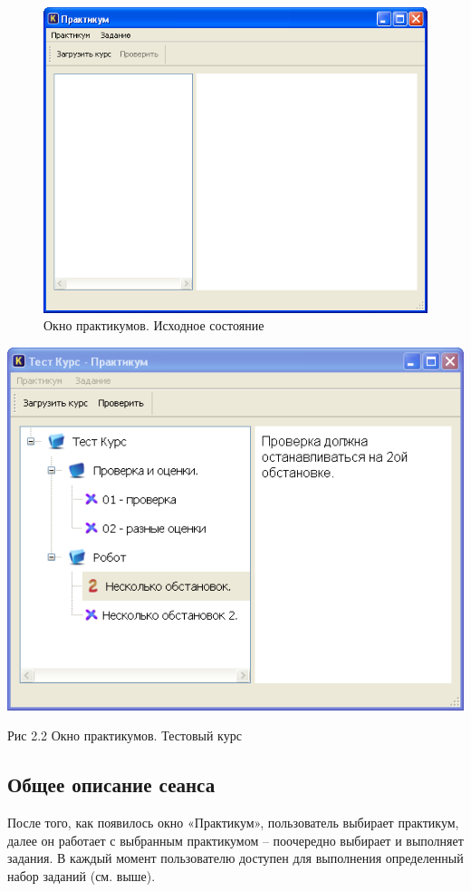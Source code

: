 \begin{figure}[!htb]
\begin{center}
\includegraphics[scale=0.7]{pr1.png}
\caption{Окно практикумов. Исходное состояние}
\end{center}
\end{figure}

\begin{center}
\includegraphics[scale=0.7]{pr3.png}


Рис 2.2 Окно практикумов. Тестовый курс
\end{center}

\subsection {Общее описание сеанса }
После того, как появилось окно «Практикум», пользователь выбирает практикум, далее он работает с выбранным практикумом – поочередно выбирает и выполняет задания. В каждый момент пользователю доступен для выполнения определенный набор заданий (см. выше). 
	
